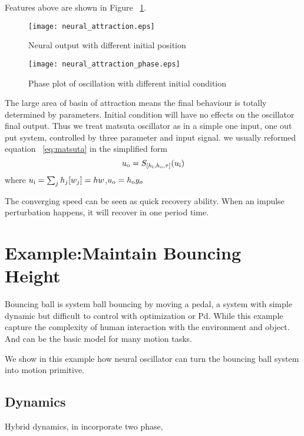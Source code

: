 Features above are shown in Figure ~\ref{fig:time_timeAttraction}.
\begin{figure}
\begin{center}
\texttt{[image: neural\_attraction.eps]}
\end{center}
\caption{Neural output with different initial position}
\label{fig:time_timeAttraction}
\end{figure}

\begin{figure}
\begin{center}
\texttt{[image: neural\_attraction\_phase.eps]}
\end{center}
\caption{Phase plot of oscillation with different initial condition}
\label{fig:phase_attraction}
\end{figure}
 
The large area of basin of attraction means the final behaviour is totally determined by parameters. 
Initial condition will have no effects on the oscillator final output. 
Thus we treat matsuta oscillator as in a simple one input, one out put system, controlled by three parameter and input signal. 
we usually reformed equation ~\ref{eq:matsuta} in the simplified form
\begin{equation}
\label{eq:simplematsuta}
u_{\mathrm{o}}=S_{[h_{\mathrm{i}},h_{\mathrm{o}},\tau]}(u_{\mathrm{i}})
\end{equation}
where $u_{\mathrm{i}}=\sum_{j}h_{j}[w_{j}]=hw$,$u_{\mathrm{o}}=h_{\mathrm{o}} y_{o}$





The converging speed can be seen as quick recovery ability.
When an impulse perturbation happens, it will recover in one period time.


\section{Example:Maintain Bouncing Height}

Bouncing ball is system ball bouncing by moving a pedal, a system with simple dynamic but difficult to control with optimization or Pd. 
While this example capture the complexity of human interaction with the environment and object. 
And can be the basic model for many motion tasks.

We show in this example how neural oscillator can turn the bouncing ball system into motion primitive.
\subsection*{Dynamics}
Hybrid dynamics, in incorporate two phase, 
 

